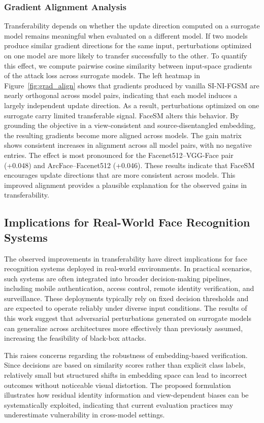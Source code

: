 \documentclass[a4paper,fleqn]{cas-dc}
\begin{document}
\subsubsection{Gradient Alignment Analysis}
Transferability depends on whether the update direction computed on a surrogate model remains meaningful when evaluated on a different model. If two models produce similar gradient directions for the same input, perturbations optimized on one model are more likely to transfer successfully to the other. To quantify this effect, we compute pairwise cosine similarity between input-space gradients of the attack loss across surrogate models. The left heatmap in Figure~\ref{fig:grad_align} shows that gradients produced by vanilla SI-NI-FGSM are nearly orthogonal across model pairs, indicating that each model induces a largely independent update direction. As a result, perturbations optimized on one surrogate carry limited transferable signal.
FaceSM alters this behavior. By grounding the objective in a view-consistent and source-disentangled embedding, the resulting gradients become more aligned across models. The gain matrix shows consistent increases in alignment across all model pairs, with no negative entries. The effect is most pronounced for the Facenet512–VGG-Face pair (+0.048) and ArcFace–Facenet512 (+0.046). These results indicate that FaceSM encourages update directions that are more consistent across models. This improved alignment provides a plausible explanation for the observed gains in transferability.

\subsection{Implications for Real-World Face Recognition Systems}

The observed improvements in transferability have direct implications for face recognition systems deployed in real-world environments. In practical scenarios, such systems are often integrated into broader decision-making pipelines, including mobile authentication, access control, remote identity verification, and surveillance. These deployments typically rely on fixed decision thresholds and are expected to operate reliably under diverse input conditions. The results of this work suggest that adversarial perturbations generated on surrogate models can generalize across architectures more effectively than previously assumed, increasing the feasibility of black-box attacks.

This raises concerns regarding the robustness of embedding-based verification. Since decisions are based on similarity scores rather than explicit class labels, relatively small but structured shifts in embedding space can lead to incorrect outcomes without noticeable visual distortion. The proposed formulation illustrates how residual identity information and view-dependent biases can be systematically exploited, indicating that current evaluation practices may underestimate vulnerability in cross-model settings.
\end{document}
